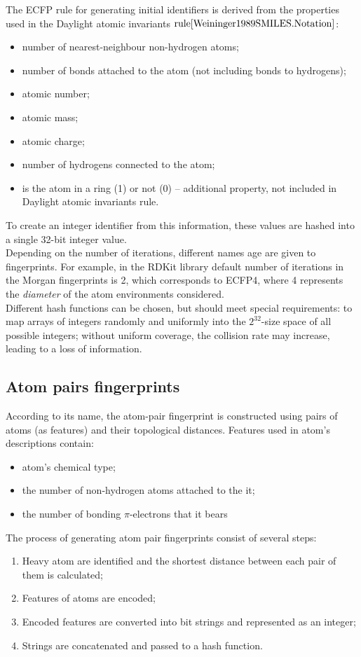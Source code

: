 The ECFP rule for generating initial identifiers is derived from the properties 
used in the Daylight atomic invariants $\text{rule}{\cite{Weininger1989SMILES.Notation}}$:
 \begin{itemize}
     \item number of nearest-neighbour non-hydrogen atoms;
     \item number of bonds attached to the atom (not including bonds to hydrogens);
     \item atomic number;
     \item atomic mass;
     \item atomic charge;
     \item number of hydrogens connected to the atom;
     \item is the atom in a ring (1) or not (0) -- additional property, not included in Daylight atomic invariants rule.
 \end{itemize}
 To create an integer identifier from this information, these values are hashed 
into a single 32-bit integer value.\\
 
 Depending on the number of iterations, different names age are given to fingerprints.
 For example, in the RDKit library default number of iterations in the Morgan fingerprints 
is 2, which corresponds to ECFP4, where 4 represents the \textit{diameter} of the 
atom environments considered.\\ %
 
 Different hash functions can be chosen, but should meet special requirements: to 
map arrays of integers randomly and uniformly into the $2^{32}$-size space of all 
possible integers; without uniform coverage, the collision rate may increase, leading 
to a loss of information.

\subsection{Atom pairs fingerprints}
 According to its name, the atom-pair fingerprint is constructed using pairs of 
atoms (as features) and their topological distances.
 Features used in atom's descriptions contain:
\begin{itemize}
    \item atom's chemical type;
    \item the number of non-hydrogen atoms attached to the it;
    \item the number of bonding $\pi$-electrons that it bears
\end{itemize}
The process of generating atom pair fingerprints consist of several steps:
\begin{enumerate}
    \item Heavy atom are identified and the shortest distance between each pair of them is calculated;
    \item Features of atoms are encoded;
    \item Encoded features are  converted into bit strings and represented as an integer;
    \item Strings are concatenated and passed to a hash function.
\end{enumerate}

